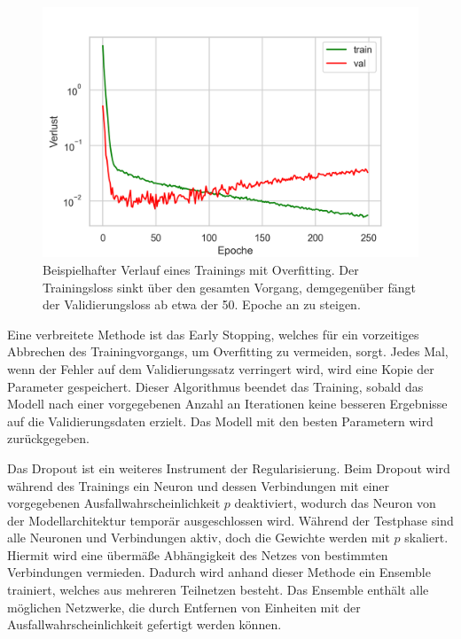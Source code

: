 \begin{figure}[h!]
\centering
\includegraphics[width=12cm]{98_images/AlexNet_log_scale.png}
\caption{Beispielhafter Verlauf eines Trainings mit Overfitting. Der Trainingsloss sinkt über den gesamten Vorgang, demgegenüber fängt der Validierungsloss ab etwa der 50. Epoche an zu steigen.}
\label{fig:alexnet-log-scale}
\end{figure}

\mypar Eine verbreitete Methode ist das Early Stopping, welches für ein vorzeitiges Abbrechen des Trainingvorgangs, um Overfitting zu vermeiden, sorgt. Jedes Mal, wenn der Fehler auf dem Validierungssatz verringert wird, wird eine Kopie der Parameter gespeichert. Dieser Algorithmus beendet das Training, sobald das Modell nach einer vorgegebenen Anzahl an Iterationen keine besseren Ergebnisse auf die Validierungsdaten erzielt. Das Modell mit den besten Parametern wird zurückgegeben. \cite{Goodfellow-et-al-2016}

\mypar Das Dropout ist ein weiteres Instrument der Regularisierung. Beim Dropout wird während des Trainings ein Neuron und dessen Verbindungen mit einer vorgegebenen Ausfallwahrscheinlichkeit $p$ deaktiviert, wodurch das Neuron von der Modellarchitektur temporär ausgeschlossen wird. Während der Testphase sind alle Neuronen und Verbindungen aktiv, doch die Gewichte werden mit $p$ skaliert. Hiermit wird eine übermäße Abhängigkeit des Netzes von bestimmten Verbindungen vermieden. Dadurch wird anhand dieser Methode ein Ensemble trainiert, welches aus mehreren Teilnetzen besteht. Das Ensemble enthält alle möglichen Netzwerke, die durch Entfernen von Einheiten mit der Ausfallwahrscheinlichkeit gefertigt werden können. \cite{dropout}

